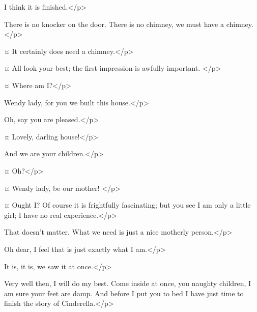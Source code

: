 \begin{drama}
\firsttwinspeaks
I think it is finished.</p>

\peterspeaks
There is no knocker on the door.
There is no chimney, we must have a chimney.
</p>

\johnspeaks {}¤
It certainly does need a chimney.</p>


\peterspeaks {}¤
All look your best; the first impression is awfully important.
</p>

\wendyspeaks {}¤
Where am I?</p>

\slightlyspeaks
Wendy lady, for you we built this house.</p>

Oh, say you are pleased.</p>

\wendyspeaks {}¤
Lovely, darling house!</p>

\firsttwinspeaks
And we are your children.</p>

\wendyspeaks {}¤
Oh?</p>

 ¤
Wendy lady, be our mother!
</p>

\wendyspeaks {}¤
Ought I?
Of course it is frightfully fascinating; but you see I am only a little girl; I have no real experience.</p>

That doesn't matter.
What we need is just a nice motherly person.</p>

\wendyspeaks
Oh dear, I feel that is just exactly what I am.</p>

It is, it is, we saw it at once.</p>

\wendyspeaks
Very well then, I will do my best.
Come inside at once, you naughty children, I am sure your feet are damp.
And before I put you to bed I have just time to finish the story of Cinderella.</p>


\end{drama}
